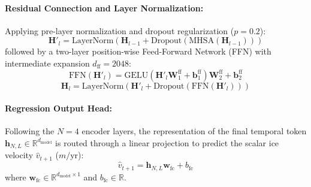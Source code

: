 \documentclass{mnnit}
\begin{document}
\paragraph{Residual Connection and Layer Normalization:}
Applying pre-layer normalization and dropout regularization ($p = 0.2$):
\begin{equation}
    \mathbf{H}'_{l} = \text{LayerNorm}\left(\mathbf{H}_{l-1} + \text{Dropout}\left(\text{MHSA}(\mathbf{H}_{l-1})\right)\right)
\end{equation}
followed by a two-layer position-wise Feed-Forward Network (FFN) with intermediate expansion $d_{\text{ff}} = 2048$:
\begin{equation}
    \text{FFN}(\mathbf{H}'_l) = \text{GELU}\left(\mathbf{H}'_l \mathbf{W}_1^{\text{ff}} + \mathbf{b}_1^{\text{ff}}\right) \mathbf{W}_2^{\text{ff}} + \mathbf{b}_2^{\text{ff}}
\end{equation}
\begin{equation}
    \mathbf{H}_l = \text{LayerNorm}\left(\mathbf{H}'_l + \text{Dropout}\left(\text{FFN}(\mathbf{H}'_l)\right)\right)
\end{equation}

\paragraph{Regression Output Head:}
Following the $N = 4$ encoder layers, the representation of the final temporal token $\mathbf{h}_{N, L} \in \mathbb{R}^{d_{\text{model}}}$ is routed through a linear projection to predict the scalar ice velocity $\hat{v}_{t+1}$ ($m/\text{yr}$):
\begin{equation}
    \hat{v}_{t+1} = \mathbf{h}_{N, L} \mathbf{w}_{\text{fc}} + b_{\text{fc}}
    \label{eq:cryoformer_output}
\end{equation}
where $\mathbf{w}_{\text{fc}} \in \mathbb{R}^{d_{\text{model}} \times 1}$ and $b_{\text{fc}} \in \mathbb{R}$.
\end{document}

